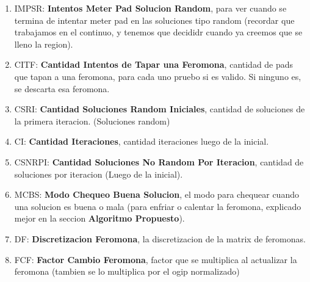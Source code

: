 \begin{enumerate}
\item IMPSR: \textbf{Intentos Meter Pad Solucion Random}, para ver cuando se termina de intentar meter pad en las soluciones tipo random (recordar que trabajamos en el continuo, y tenemos que decididr cuando ya creemos que se lleno la region).
\item CITF:  \textbf{Cantidad Intentos de Tapar una Feromona}, cantidad de pads que tapan a una feromona, para cada uno pruebo si es valido. Si ninguno es, se descarta esa feromona.
\item CSRI: \textbf{Cantidad Soluciones Random Iniciales}, cantidad de soluciones de la primera iteracion. (Soluciones random)
\item CI: \textbf{Cantidad Iteraciones}, cantidad iteraciones luego de la inicial.
\item CSNRPI: \textbf{Cantidad Soluciones No Random Por Iteracion}, cantidad de soluciones por iteracion (Luego de la inicial).
\item MCBS: \textbf{Modo Chequeo Buena Solucion}, el modo para chequear cuando una solucion es buena o mala (para enfriar o calentar la feromona, explicado mejor en la seccion \textbf{Algoritmo Propuesto}).
\item DF: \textbf{Discretizacion Feromona}, la discretizacion de la matrix de feromonas.
\item FCF: \textbf{Factor Cambio Feromona}, factor que se multiplica al actualizar la feromona (tambien se lo multiplica por el ogip normalizado)
\end{enumerate}













